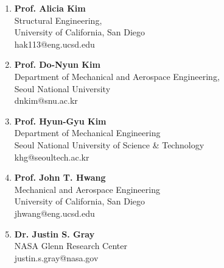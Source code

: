 \documentclass[margin, 10pt]{res} %
\begin{document}
\begin{resume}
\begin{enumerate}
    \item \textbf{Prof. Alicia Kim}\\
    Structural Engineering,  \\
    University of California, San Diego\\
    hak113@eng.ucsd.edu \\

    \item \textbf{Prof. Do-Nyun Kim}\\
    Department of Mechanical and Aerospace Engineering, \\
    Seoul National University\\
    dnkim@snu.ac.kr\\
    
    \item \textbf{Prof. Hyun-Gyu Kim}\\
    Department of Mechanical Engineering\\
    Seoul National University of Science \& Technology\\
    khg@seoultech.ac.kr \\ 
    
    \item \textbf{Prof. John T. Hwang}\\
    Mechanical and Aerospace Engineering  \\
    University of California, San Diego\\
    jhwang@eng.ucsd.edu \\
    
    \item \textbf{Dr. Justin S. Gray}\\
    NASA Glenn Research Center  \\
    justin.s.gray@nasa.gov \\
    
    
\end{enumerate}

\end{resume}
\end{document}
